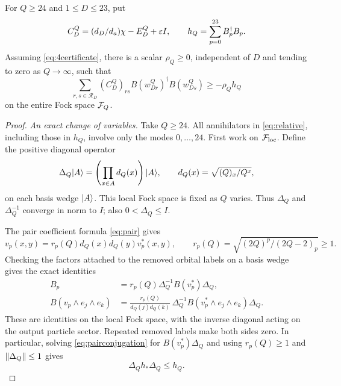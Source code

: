 \begin{lemma}\label{lem:transfer}
For $Q\ge24$ and $1\le D\le23$, put
\[
 C_D^Q=(d_D/d_a)\chi-E_D^Q+\varepsilon I,
 \qquad h_Q=\sum_{p=0}^{23}B_p^\dagger B_p.
\]
Assuming \eqref{eq:4certificate}, there is a scalar $\rho_Q\ge0$,
independent of $D$ and tending to zero as $Q\to\infty$, such that
\begin{equation}\label{eq:relative}
 \sum_{r,s\in\mathcal R_D}(C_D^Q)_{rs}
 B(w_{Dr}^Q)^\dagger B(w_{Ds}^Q)
 \ge-\rho_Qh_Q
\end{equation}
on the entire Fock space $\mathcal F_Q$.
\end{lemma}
\begin{proof}
\emph{An exact change of variables.}
Take $Q\ge24$.  All annihilators in \eqref{eq:relative}, including those
in $h_Q$, involve only the modes $0,\ldots,24$. First work on
$\mathcal F_{\mathrm{loc}}$. Define the positive diagonal operator
\[
 \Delta_Q\lvert A\rangle=\left(\prod_{x\in A}d_Q(x)\right)\lvert A\rangle,
 \qquad d_Q(x)=\sqrt{(Q)_x/Q^x},
\]
on each basis wedge $\lvert A\rangle$.  This local Fock space is fixed as $Q$
varies.  Thus $\Delta_Q$ and $\Delta_Q^{-1}$ converge in norm to $I$;
also $0<\Delta_Q\le I$.

The pair coefficient formula \eqref{eq:pair} gives
\[
 v_p(x,y)=r_p(Q)d_Q(x)d_Q(y)v_p^*(x,y),
 \qquad r_p(Q)=\sqrt{(2Q)^p/(2Q-2)_p}\ge1.
\]
Checking the factors attached to the removed orbital labels on a basis
wedge gives the exact identities
\begin{align}
 B_p&=r_p(Q)\Delta_Q^{-1}B(v_p^*)\Delta_Q,
       \label{eq:pairconjugation}\\
 B(v_p\wedge e_j\wedge e_k)
 &=\frac{r_p(Q)}{d_Q(j)d_Q(k)}\,
   \Delta_Q^{-1}B(v_p^*\wedge e_j\wedge e_k)\Delta_Q.
       \label{eq:fourconjugation}
\end{align}
These are identities on the local Fock space, with the inverse diagonal
acting on the output particle sector.  Repeated removed labels make both
sides zero.  In particular, solving \eqref{eq:pairconjugation} for
$B(v_p^*)\Delta_Q$ and using $r_p(Q)\ge1$ and $\lVert \Delta_Q\rVert\le1$
gives
\begin{equation}\label{eq:pairenergytransfer}
 \Delta_Q h_*\Delta_Q\le h_Q.
\end{equation}


\end{proof}
